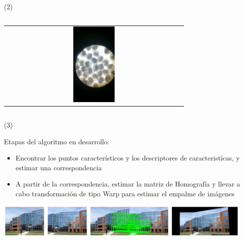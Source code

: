 \begin{frame}{ (2)}
\begin{columns}
\begin{column}{0.64\textwidth}
\begin{center}
\begin{tabular}{c}
         \includegraphics[width=0.24\textwidth]{2022_ConteoOstioncitos/figs/R0126.png}\\
          \end{tabular}
\end{center}
\end{column} 
\end{columns} 
\end{frame}

\begin{frame}{ (3)}



Etapas del algoritmo en desarrollo:
\begin{itemize}
        \item Encontrar los puntos característicos y los descriptores de caracteristícas, y estimar una correspondencia
        \item A partir de la correspondencia, estimar la matriz de Homografía y llevar a cabo transformación de tipo Warp para estimar el empalme de imágenes
	\end{itemize}

\begin{center}
 \includegraphics[width=0.95\textwidth]{2022_ConteoOstioncitos/figs/ImageMatchingAndRegistration.png}
\end{center}

\end{frame}


